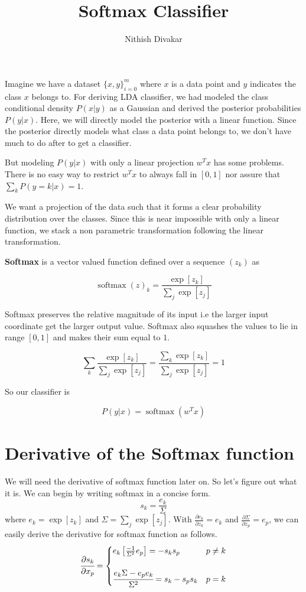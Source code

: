 \documentclass[12pt,crop=false,class=article,convert={density=300,outext=.compiled.png}]{standalone}
\title{\Huge Softmax Classifier}
\date{}
\author{Nithish Divakar}
\begin{document}
\maketitle

Imagine we have a dataset $\{x,y\}_{i=0}^m$ where $x$ is a data point
and $y$ indicates the class $x$ belongs to. For deriving LDA classifier,
we had modeled the class conditional density $P(x|y)$ as a Gaussian and
derived the posterior probabilities $P(y|x)$. Here, we will directly
model the posterior with a linear function. Since the posterior directly
models what class a data point belongs to, we don't have much to do
after to get a classifier.

But modeling $P(y|x)$ with only a linear projection $w^Tx$ has some
problems. There is no easy way to restrict $w^Tx$ to always fall in
$[0,1]$ nor assure that $\sum_k P(y=k|x) = 1$.

We want a projection of the data such that it forms a clear probability
distribution over the classes. Since this is near impossible with only a
linear function, we stack a non parametric transformation following the
linear transformation.

\textbf{Softmax} is a vector valued function defined over a sequence $(z_k)$
as

$$\operatorname{softmax}(z)_k = \frac{\operatorname{exp}[z_k]}{\sum_j\operatorname{exp}[z_j]}$$



Softmax preserves the relative magnitude of its input i.e the larger
input coordinate get the larger output value. Softmax also squashes the
values to lie in range $[0,1]$ and makes their sum equal to $1$.

$$\sum_k \frac{\operatorname{exp}[z_k]}{\sum_j\operatorname{exp}[z_j]} = \frac{\sum_k \operatorname{exp}[z_k]}{\sum_j\operatorname{exp}[z_j]}  = 1$$



So our classifier is

$$P(y|x) = \operatorname{softmax}(w^Tx)$$



\section*{Derivative of the Softmax function}

We will need the derivative of softmax function later on. So let's
figure out what it is. We can begin by writing softmax in a concise
form.
%
$$s_k = \frac{e_k}{\Sigma}$$
%
where
$e_k = \operatorname{exp}[z_k]$ and
$\Sigma = \sum_j\operatorname{exp}[z_j]$. With
$\frac{\partial e_k}{\partial z_k} = e_k$ and
$\frac{\partial \Sigma}{\partial z_p} = e_p$, we can easily derive the
derivative for softmax function as follows.
%
$$
\cfrac{\partial s_k}{\partial x_p} = \begin{cases}
e_k\left[ \frac{-1}{\Sigma^2} e_p\right] = -s_ks_p & p \neq k
\\\\
\cfrac{  e_k \Sigma-  e_p e_k}{\Sigma^2} = s_k-s_ps_k & p=k
\end{cases}
$$
\end{document}
